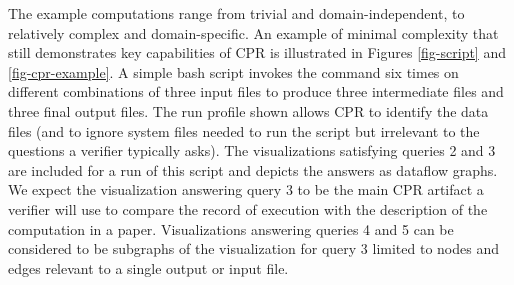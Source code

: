 The example computations range from trivial and domain-independent, to relatively complex and domain-specific. An example of minimal complexity that still demonstrates key capabilities of CPR is illustrated in Figures \ref{fig-script} and \ref{fig-cpr-example}. A simple bash script invokes the  command six times on different combinations of three input files to produce three intermediate files and three final output files. The run profile shown allows CPR to identify the data files (and to ignore system files needed to run the script but irrelevant to the questions a verifier typically asks).  The visualizations satisfying queries 2 and 3 are included for a run of this script and depicts the answers as dataflow graphs. We expect the visualization answering query 3 to be the main CPR artifact a verifier will use to compare the record of execution with the description of the computation in a paper. Visualizations answering queries 4 and 5 can be considered to be subgraphs of the visualization for query 3 limited to nodes and edges relevant to a single output or input file.

